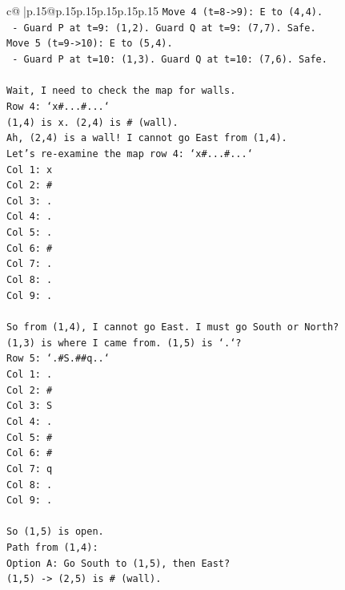 \documentclass{article}
\begin{document}
{\begin{supertabular}{c@{$\;$}|p{.15\linewidth}@{}p{.15\linewidth}p{.15\linewidth}p{.15\linewidth}p{.15\linewidth}p{.15\linewidth}}
{{{\texttt{Move 4 (t=8{-}>9): E to (4,4).} \\
\texttt{  {-} Guard P at t=9: (1,2). Guard Q at t=9: (7,7). Safe.} \\
\texttt{Move 5 (t=9{-}>10): E to (5,4).} \\
\texttt{  {-} Guard P at t=10: (1,3). Guard Q at t=10: (7,6). Safe.} \\
\\ 
\texttt{Wait, I need to check the map for walls.} \\
\texttt{Row 4: `x\#...\#...`} \\
\texttt{(1,4) is x. (2,4) is \# (wall).} \\
\texttt{Ah, (2,4) is a wall! I cannot go East from (1,4).} \\
\texttt{Let's re{-}examine the map row 4: `x\#...\#...`} \\
\texttt{Col 1: x} \\
\texttt{Col 2: \#} \\
\texttt{Col 3: .} \\
\texttt{Col 4: .} \\
\texttt{Col 5: .} \\
\texttt{Col 6: \#} \\
\texttt{Col 7: .} \\
\texttt{Col 8: .} \\
\texttt{Col 9: .} \\
\\ 
\texttt{So from (1,4), I cannot go East. I must go South or North?} \\
\texttt{(1,3) is where I came from. (1,5) is `.`?} \\
\texttt{Row 5: `.\#S.\#\#q..`} \\
\texttt{Col 1: .} \\
\texttt{Col 2: \#} \\
\texttt{Col 3: S} \\
\texttt{Col 4: .} \\
\texttt{Col 5: \#} \\
\texttt{Col 6: \#} \\
\texttt{Col 7: q} \\
\texttt{Col 8: .} \\
\texttt{Col 9: .} \\
\\ 
\texttt{So (1,5) is open.} \\
\texttt{Path from (1,4):} \\
\texttt{Option A: Go South to (1,5), then East?} \\
\texttt{(1,5) {-}> (2,5) is \# (wall).} \\
}}}
\end{supertabular}}
\end{document}
